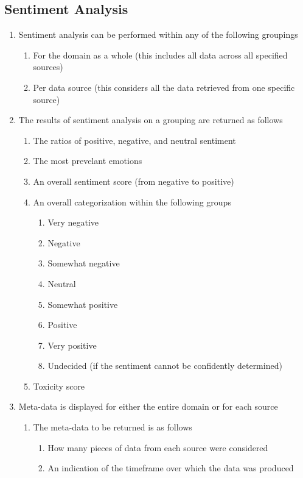 \documentclass[12pt]{article}
\begin{document}
\subsection{Sentiment Analysis}
\begin{enumerate}
  \item Sentiment analysis can be performed within any of the following groupings
        \begin{enumerate}
          \item For the domain as a whole (this includes all data across all specified sources)
          \item Per data source (this considers all the data retrieved from one specific source)
        \end{enumerate}
  \item The results of sentiment analysis on a grouping are returned as follows
        \begin{enumerate}
          \item The ratios of positive, negative, and neutral sentiment
          \item The most prevelant emotions
          \item An overall sentiment score (from negative to positive)
          \item An overall categorization within the following groups
                \begin{enumerate}
                  \item Very negative
                  \item Negative
                  \item Somewhat negative
                  \item Neutral
                  \item Somewhat positive
                  \item Positive
                  \item Very positive
                  \item Undecided (if the sentiment cannot be confidently determined)
                \end{enumerate}
          \item Toxicity score
        \end{enumerate}
  \item Meta-data is displayed for either the entire domain or for each source
        \begin{enumerate}
          \item The meta-data to be returned is as follows
                \begin{enumerate}
                  \item How many pieces of data from each source were considered
                  \item An indication of the timeframe over which the data was produced
                \end{enumerate}
        \end{enumerate}
\end{enumerate}
\end{document}
